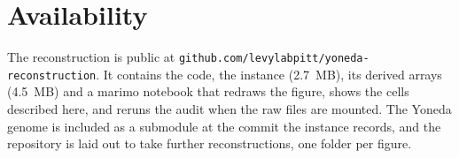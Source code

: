 \documentclass[11pt]{article}
\begin{document}
\section{Availability}

The reconstruction is public at \texttt{github.com/levylabpitt/yoneda-reconstruction}. It contains the code, the instance (2.7~MB), its derived arrays (4.5~MB) and a marimo notebook that redraws the figure, shows the cells described here, and reruns the audit when the raw files are mounted. The Yoneda genome is included as a submodule at the commit the instance records, and the repository is laid out to take further reconstructions, one folder per figure.


\end{document}
